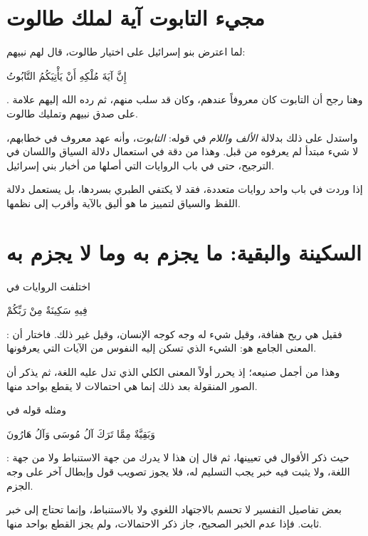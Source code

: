 \section{مجيء التابوت آية لملك طالوت}
لما اعترض بنو إسرائيل على اختيار طالوت، قال لهم نبيهم: \begin{ayah}إِنَّ آيَةَ مُلْكِهِ أَنْ يَأْتِيَكُمُ التَّابُوتُ\end{ayah}. وهنا رجح  أن التابوت كان معروفاً عندهم، وكان قد سلب منهم، ثم رده الله إليهم علامة على صدق نبيهم وتمليك طالوت.

واستدل على ذلك بدلالة \textit{الألف واللام} في قوله: \textit{التابوت}، وأنه عهد معروف في خطابهم، لا شيء مبتدأ لم يعرفوه من قبل. وهذا من دقة  في استعمال دلالة السياق واللسان في الترجيح، حتى في باب الروايات التي أصلها من أخبار بني إسرائيل.

\begin{fawaid}
إذا وردت في باب واحد روايات متعددة، فقد لا يكتفي الطبري بسردها، بل يستعمل دلالة اللفظ والسياق لتمييز ما هو أليق بالآية وأقرب إلى نظمها.
\end{fawaid}

\section{السكينة والبقية: ما يجزم به وما لا يجزم به}
اختلفت الروايات في \begin{ayah}فِيهِ سَكِينَةٌ مِنْ رَبِّكُمْ\end{ayah}: فقيل هي ريح هفافة، وقيل شيء له وجه كوجه الإنسان، وقيل غير ذلك. فاختار  أن المعنى الجامع هو: الشيء الذي تسكن إليه النفوس من الآيات التي يعرفونها.

وهذا من أجمل صنيعه؛ إذ يحرر أولاً المعنى الكلي الذي تدل عليه اللغة، ثم يذكر أن الصور المنقولة بعد ذلك إنما هي احتمالات لا يقطع بواحد منها.

ومثله قوله في \begin{ayah}وَبَقِيَّةٌ مِمَّا تَرَكَ آلُ مُوسَى وَآلُ هَارُونَ\end{ayah}: حيث ذكر الأقوال في تعيينها، ثم قال إن هذا لا يدرك من جهة الاستنباط ولا من جهة اللغة، ولا يثبت فيه خبر يجب التسليم له، فلا يجوز تصويب قول وإبطال آخر على وجه الجزم.

\begin{fawaid}
بعض تفاصيل التفسير لا تحسم بالاجتهاد اللغوي ولا بالاستنباط، وإنما تحتاج إلى خبر ثابت. فإذا عدم الخبر الصحيح، جاز ذكر الاحتمالات، ولم يجز القطع بواحد منها.
\end{fawaid}

